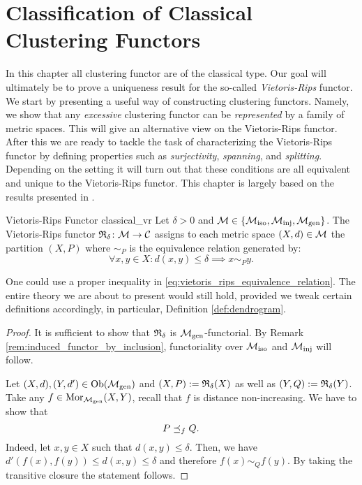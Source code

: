 \chapter{Classification of Classical Clustering Functors}
\label{chapter__classical}
In this chapter all clustering functor are of the classical type.
Our goal will ultimately be to prove a uniqueness result for the so-called \emph{Vietoris-Rips} functor.
%
We start by presenting a useful way of constructing clustering functors. Namely, we show that any \emph{excessive} clustering functor can be \emph{represented} by a family of metric spaces. This will give an alternative view on the Vietoris-Rips functor.
%
After this we are ready to tackle the task of characterizing the Vietoris-Rips functor by defining properties such as \emph{surjectivity}, \emph{spanning}, and \emph{splitting}. Depending on the setting it will turn out that these conditions are all equivalent and unique to the Vietoris-Rips functor.
%
This chapter is largely based on the results presented in \cite{Carlsson2010}.

\begin{defprop}{Vietoris-Rips Functor \cite[Def.~6.1]{Carlsson2010}}{classical_vr}
    Let $\delta > 0$ and $\mathcal{M} \in \{{\mathcal{M}_\mathrm{iso}}, {\mathcal{M}_\mathrm{inj}}, {\mathcal{M}_\mathrm{gen}}\}$. The Vietoris-Rips functor $\mathfrak{R}_\delta\colon \mathcal{M} \to \mathcal{C}$ assigns to each metric space $(X,d) \in \mathcal{M}$ the partition $(X,P)$ where $\sim_P$ is the equivalence relation generated by:
    \begin{equation}
        \label{eq:vietoris_rips_equivalence_relation}
        \forall x,y \in X: d(x,y) \leq \delta \implies x \sim_P y.
    \end{equation}
\end{defprop}


\begin{myremark}{}{}
One could use a proper inequality in \eqref{eq:vietoris_rips_equivalence_relation}. The entire theory we are about to present would still hold, provided we tweak certain definitions accordingly, in particular, Definition \ref{def:dendrogram}.
\end{myremark}

\begin{proof}
It is sufficient to show that $\mathfrak{R}_\delta$ is ${\mathcal{M}_\mathrm{gen}}$-functorial. By Remark \ref{rem:induced_functor_by_inclusion}, functoriality over ${\mathcal{M}_\mathrm{iso}}$ and ${\mathcal{M}_\mathrm{inj}}$ will follow.

Let $(X,d),(Y,d') \in \mathrm {Ob}({\mathcal{M}_\mathrm{gen}})$ and $(X,P) := \mathfrak{R}_\delta(X)$ as well as $(Y,Q) := \mathfrak{R}_\delta(Y)$.
Take any $f \in \mathrm {Mor}_{\mathcal{M}_\mathrm{gen}}(X,Y)$, recall that $f$ is distance non-increasing.
We have to show that 
$$P \preceq_f Q.$$
Indeed, let $x,y \in X$ such that $d(x,y) \leq \delta$.
Then, we have $d'(f(x), f(y)) \leq d(x,y) \leq \delta$ and therefore $f(x) \sim_{Q} f(y)$.
By taking the transitive closure the statement follows.
\end{proof}

